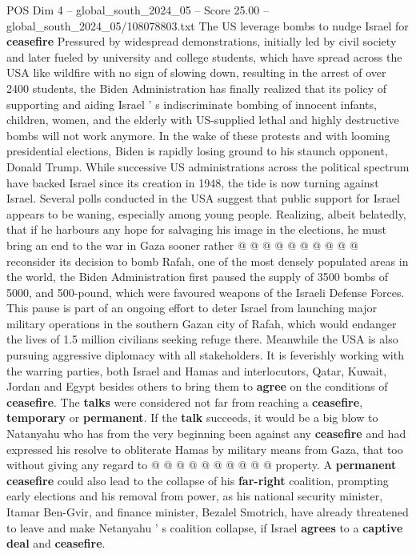 \begin{textsample}{POS Dim 4 – global\_south\_2024\_05 – Score 25.00 – global\_south\_2024\_05/108078803.txt}  \label{ex:f4_pos_184}
The US leverage bombs to nudge Israel for \textbf{ceasefire} Pressured by widespread demonstrations, initially led by civil society and later fueled by university and college students, which have spread across the USA like wildfire with no sign of slowing down, resulting in the arrest of over 2400 students, the Biden Administration has finally realized that its policy of supporting and aiding Israel ' s indiscriminate bombing of innocent infants, children, women, and the elderly with US-supplied lethal and highly destructive bombs will not work anymore.
In the wake of these protests and with looming presidential elections, Biden is rapidly losing ground to his staunch opponent, Donald Trump.
While successive US administrations across the political spectrum have backed Israel since its creation in 1948, the tide is now turning against Israel.
Several polls conducted in the USA suggest that public support for Israel appears to be waning, especially among young people.
Realizing, albeit belatedly, that if he harbours any hope for salvaging his image in the elections, he must bring an end to the war in Gaza sooner rather @ @ @ @ @ @ @ @ @ @ reconsider its decision to bomb Rafah, one of the most densely populated areas in the world, the Biden Administration first paused the supply of 3500 bombs of 5000, and 500-pound, which were favoured weapons of the Israeli Defense Forces.
This pause is part of an ongoing effort to deter Israel from launching major military operations in the southern Gazan city of Rafah, which would endanger the lives of 1.5 million civilians seeking refuge there.
Meanwhile the USA is also pursuing aggressive diplomacy with all stakeholders.
It is feverishly working with the warring parties, both Israel and Hamas and interlocutors, Qatar, Kuwait, Jordan and Egypt besides others to bring them to \textbf{agree} on the conditions of \textbf{ceasefire}.
The \textbf{talks} were considered not far from reaching a \textbf{ceasefire}, \textbf{temporary} or \textbf{permanent}.
If the \textbf{talk} succeeds, it would be a big blow to Natanyahu who has from the very beginning been against any \textbf{ceasefire} and had expressed his resolve to obliterate Hamas by military means from Gaza, that too without giving any regard to @ @ @ @ @ @ @ @ @ @ property.
A \textbf{permanent} \textbf{ceasefire} could also lead to the collapse of his \textbf{far-right} coalition, prompting early elections and his removal from power, as his national security minister, Itamar Ben-Gvir, and finance minister, Bezalel Smotrich, have already threatened to leave and make Netanyahu ' s coalition collapse, if Israel \textbf{agrees} to a \textbf{captive} \textbf{deal} and \textbf{ceasefire}.

\end{textsample}
